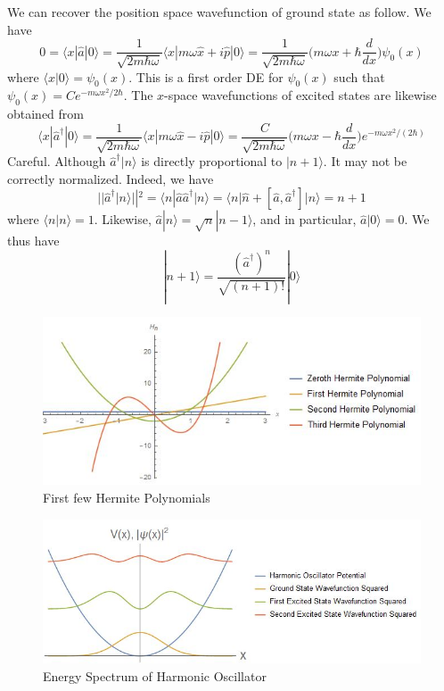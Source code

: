 \documentclass[a4paper]{article}
\begin{document}
\begin{note}
We can recover the position space wavefunction of ground state as follow. We have 
$$0=\langle x|\hat{a}|0\rangle=\frac{1}{\sqrt{2m\hbar\omega}}\langle x|m\omega\hat{x}+i\hat{p}|0\rangle=\frac{1}{\sqrt{2m\hbar\omega}}\bigg(m\omega x+\hbar\frac{d}{dx}\bigg)\psi_0(x)$$
where $\langle x|0\rangle=\psi_0(x)$. This is a first order DE for $\psi_0(x)$ such that $\psi_0(x)=Ce^{-m\omega x^2/2\hbar}$. The $x$-space wavefunctions of excited states are likewise obtained from
$$\langle x|\hat{a}^\dag|0\rangle=\frac{1}{\sqrt{2m\hbar\omega}}\langle x|m\omega\hat{x}-i\hat{p}|0\rangle=\frac{C}{\sqrt{2m\hbar\omega}}\bigg(m\omega x-\hbar\frac{d}{dx}\bigg)e^{-m\omega x^2/(2\hbar)}$$
Careful. Although $\hat{a}^\dag|n\rangle$ is directly proportional to $|n+1\rangle$. It may not be correctly normalized. Indeed, we have
$$||\hat{a}^\dag|n\rangle||^2=\langle n|\hat{a}\hat{a}^\dag|n\rangle=\langle n|\hat{n}+[\hat{a},\hat{a}^\dag]|n\rangle=n+1$$
where $\langle n|n\rangle=1$. Likewise, $\hat{a}|n\rangle=\sqrt{n}|n-1\rangle$, and in particular, $\hat{a}|0\rangle=0$. We thus have
$$|n+1\rangle=\frac{(\hat{a}^\dag)^n}{\sqrt{(n+1)!}}|0\rangle$$
\end{note}
\begin{figure}[H]
\includegraphics[scale=0.75]{Hermite}
\centering
\caption{First few Hermite Polynomials}
\label{Hermite}
\end{figure}
\begin{figure}[H]
\includegraphics[scale=0.75]{oscillator2}
\centering
\caption{Energy Spectrum of Harmonic Oscillator}
\label{oscillator2}
\end{figure}
\end{document}
